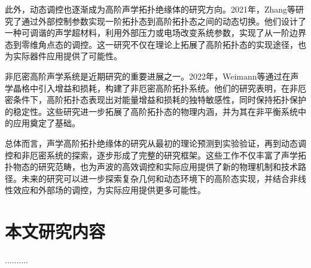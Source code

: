 此外，动态调控也逐渐成为高阶声学拓扑绝缘体的研究方向。2021年，Zhang等研究了通过外部控制参数实现一阶拓扑态到高阶拓扑态之间的动态切换。他们设计了一种可调谐的声学超材料，利用外部压力或电场改变系统参数，实现了从一阶边界态到零维角点态的调控。这一研究不仅在理论上拓展了高阶拓扑态的实现途径，也为实际器件应用提供了可能性。

非厄密高阶声学系统是近期研究的重要进展之一。2022年，Weimann等通过在声学晶格中引入增益和损耗，构建了非厄密高阶拓扑系统。他们的研究表明，在非厄密条件下，高阶拓扑态表现出对能量增益和损耗的独特敏感性，同时保持拓扑保护的稳定性。这些研究进一步拓展了高阶拓扑态的物理内涵，并为其在非平衡系统中的应用奠定了基础。

总体而言，声学高阶拓扑绝缘体的研究从最初的理论预测到实验验证，再到动态调控和非厄密系统的探索，逐步形成了完整的研究框架。这些工作不仅丰富了声学拓扑物态的研究范畴，也为声波的高效调控和实际应用提供了新的物理机制和技术路径。未来的研究可以进一步探索复杂几何和动态环境下的高阶态实现，并结合非线性效应和外部场的调控，为实际应用提供更多可能性。

\section{本文研究内容}

..........